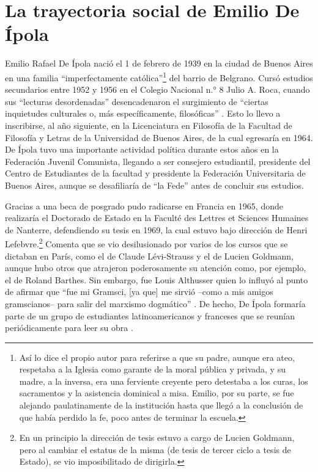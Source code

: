 \section{La trayectoria social de Emilio De Ípola}

Emilio Rafael De Ípola nació el 1 de febrero de 1939 en la ciudad de Buenos Aires en una familia \enquote{imperfectamente católica}\footnote{Así lo dice el propio autor para referirse a que su padre, aunque era ateo, respetaba a la Iglesia como garante de la moral pública y privada, y su madre, a la inversa, era una ferviente creyente pero detestaba a los curas, los sacramentos y la asistencia dominical a misa. Emilio, por su parte, se fue alejando paulatinamente de la institución hasta que llegó a la conclusión de que había perdido la fe, poco antes de terminar la escuela.} del barrio de Belgrano. Cursó estudios secundarios entre 1952 y 1956 en el Colegio Nacional n.° 8 Julio A. Roca, cuando sus \enquote{lecturas desordenadas} desencadenaron el surgimiento de \enquote{ciertas inquietudes culturales o, más específicamente, filosóficas} \parencite{1604-DEIPOLA2009}. Esto lo llevo a inscribirse, al año siguiente, en la Licenciatura en Filosofía de la Facultad de Filosofía y Letras de la Universidad de Buenos Aires, de la cual egresaría en 1964. De Ípola tuvo una importante actividad política durante estos años en la Federación Juvenil Comunista, llegando a ser consejero estudiantil, presidente del Centro de Estudiantes de la facultad y presidente la Federación Universitaria de Buenos Aires, aunque se desafiliaría de \enquote{la Fede} antes de concluir sus estudios.

Gracias a una beca de posgrado pudo radicarse en Francia en 1965, donde realizaría el Doctorado de Estado en la Faculté des Lettres et Sciences Humaines de Nanterre, defendiendo su tesis en 1969, la cual estuvo bajo dirección de Henri Lefebvre.\footnote{En un principio la dirección de tesis estuvo a cargo de Lucien Goldmann, pero al cambiar el estatus de la misma (de tesis de tercer ciclo a tesis de Estado), se vio imposibilitado de dirigirla.} Comenta que se vio desilusionado por varios de los cursos que se dictaban en París, como el de Claude Lévi-Strauss y el de Lucien Goldmann, aunque hubo otros que atrajeron poderosamente su atención como, por ejemplo, el de Roland Barthes. Sin embargo, fue Louis Althusser quien lo influyó al punto de afirmar que \enquote{fue mi Gramsci, [ya que] me sirvió --como a mis amigos gramscianos-- para salir del marxismo dogmático} \parencite[22]{1605-DEIPOLA1991}. De hecho, De Ípola formaría parte de un grupo de estudiantes latinoamericanos y franceses que se reunían periódicamente para leer su obra \parencite{1601-DEIPOLA1994,1595-DEIPOLA2007}.

